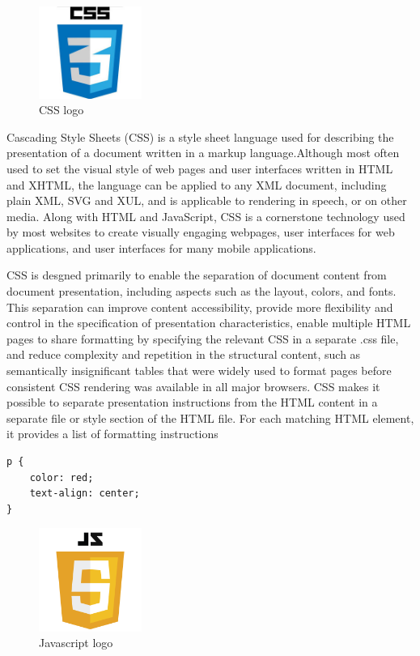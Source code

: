 \begin{figure}[!ht]
\centering
\includegraphics[width=0.3\textwidth]{input/images/CSS.jpg}                   
\caption{CSS logo}
\hspace{-1.5em}
\end{figure}
Cascading Style Sheets (CSS) is a style sheet language used for describing the presentation of a document written in a markup language.Although most often used to set the visual style of web pages and user interfaces written in HTML and XHTML, the language can be applied to any XML document, including plain XML, SVG and XUL, and is applicable to rendering in speech, or on other media. Along with HTML and JavaScript, CSS is a cornerstone technology used by most websites to create visually engaging webpages, user interfaces for web applications, and user interfaces for many mobile applications.


CSS is desgned primarily to enable the separation of document content from document presentation, including aspects such as the layout, colors, and fonts. This separation can improve content accessibility, provide more flexibility and control in the specification of presentation characteristics, enable multiple HTML pages to share formatting by specifying the relevant CSS in a separate .css file, and reduce complexity and repetition in the structural content, such as semantically insignificant tables that were widely used to format pages before consistent CSS rendering was available in all major browsers. CSS makes it possible to separate presentation instructions from the HTML content in a separate file or style section of the HTML file. For each matching HTML element, it provides a list of formatting instructions

\begin{verbatim}
p {
    color: red;
    text-align: center;
} 
\end{verbatim}
\begin{figure}[!ht]
\centering
\includegraphics[width=0.3\textwidth]{input/images/JS.png}
\caption{Javascript logo}
\hspace{-1.5em}
\end{figure}

